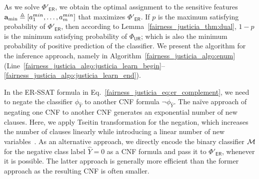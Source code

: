 As we solve $\Phi'_{\mathsf{ER}}$, we obtain the optimal assignment to the sensitive features $\mathbf{a}_{\min} \triangleq [a^{min}_1, \dots, a^{min}_{m}]$ that maximizes $\Phi'_{\mathsf{ER}}$.  If $ p $ is the maximum satisfying probability of $ \Phi'_{\mathsf{ER}} $, then according to Lemma~\ref{fairness_justicia_thm:dual}, $ 1 - p $ is the minimum satisfying probability of $ \Phi_{\mathsf{UR}} $;  which is also the minimum probability of positive prediction of the classifier. We present the algorithm for the inference approach, namely {\justicialearn} in Algorithm~\ref{fairness_justicia_algo:enum} (Line~\ref{fairness_justicia_algo:justicia_learn_begin}--\ref{fairness_justicia_algo:justicia_learn_end}).

\iffalse
\begin{algorithm}[t!]
	\caption{\justicialearn: Learning ER-SSAT Encoding}
	\label{fairness_justicia_algo:learn}
	\begin{algorithmic}[1]
		\Function{{\justicialearn}}{$ X,A,\widehat{Y} $}
		\State $ \phi_{\widehat{Y}} = \mathsf{CNF}(\widehat{Y}  = 1) $
		\State $ p_{i} = \mathsf{CalculateProb}(x_i), \forall x_i \in X $
		\State $  \Phi_\mathbf{ER} = \exists a_1,\dots, \exists a_{\numsensitive}, \R^{p_{1}}x_1, \dots, \R^{p_{\numnonsensitive}}x_{\numnonsensitive}. \; \phi_{\widehat{Y}} $
		\State $  \Phi'_\mathbf{ER} = \exists a_1,\dots, \exists a_{\numsensitive}, \R^{p_{1}}x_1, \dots, \R^{p_{\numnonsensitive}}x_{\numnonsensitive}. \; \neg \phi_{\widehat{Y}} $
		\State \Return $ \mathsf{SSAT}(\Phi_\mathbf{ER}), 1 - \mathsf{SSAT}(\Phi'_\mathbf{ER}) $
		\EndFunction
	\end{algorithmic}
\end{algorithm}
\fi

In the ER-SSAT formula in Eq.~\eqref{fairness_justicia_eq:er_complement}, we need to negate the classifier $ \phi_{\widehat{Y}} $ to another CNF formula $ \neg \phi_{\widehat{Y}} $. The na\"ive approach of negating one CNF to another CNF generates an exponential number of new clauses. Here, we apply Tseitin transformation for the negation, which increases the number of clauses linearly while introducing a linear number of new variables~\cite{tseitin1983complexity}. As an alternative approach, we directly encode the binary classifier $\mathcal{M}$ for the negative class label $\widehat{Y} = 0$ as a CNF formula and pass it to $\Phi'_{\mathsf{ER}} $, whenever it is possible. The latter approach is generally more efficient than the former approach as the resulting CNF is often smaller.  






